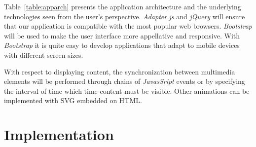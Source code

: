 \documentclass[conference,compsoc,a4paper]{IEEEtran}
\begin{document}
\begin{table}[H]
\centering
	\caption{Application Architecture}
	\label{table:apparch}

\end{table}


Table~\ref{table:apparch} presents the application architecture and the underlying technologies seen from the user's perspective. \emph{Adapter.js} and \emph{jQuery} will ensure that our application is compatible with the most popular web browsers.
\emph{Bootstrap} will be used to make the user interface more appellative and responsive. With \emph{Bootstrap} it is quite easy to develop applications that adapt to mobile devices with different screen sizes.

With respect to displaying content, the synchronization between multimedia elements will be performed through chains of \emph{JavasSript} events or by specifying the interval of time which time content must be visible. Other animations can be implemented with \gls{SVG} embedded on \gls{HTML}.

\section{Implementation}
\end{document}
